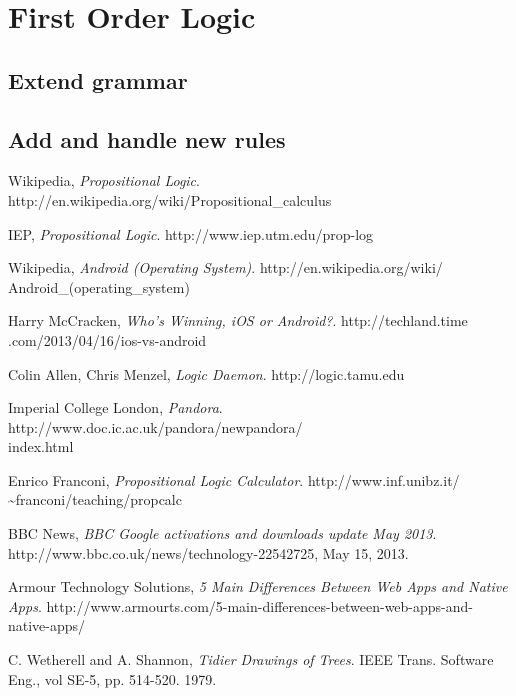 \documentclass{report}
\begin{document}
\section{First Order Logic}
\subsection{Extend grammar}
\subsection{Add and handle new rules}

\begin{thebibliography}{9}

  Wikipedia,
  \emph{Propositional Logic}.
  http://en.wikipedia.org/wiki/Propositional\_calculus

  IEP,
  \emph{Propositional Logic}.
  http://www.iep.utm.edu/prop-log

  Wikipedia,
  \emph{Android (Operating System)}.
  http://en.wikipedia.org/wiki/\\Android\_(operating\_system)

  Harry McCracken,
  \emph{Who’s Winning, iOS or Android?}.
  http://techland.time\\.com/2013/04/16/ios-vs-android

  Colin Allen, Chris Menzel,
  \emph{Logic Daemon}.
  http://logic.tamu.edu

  Imperial College London,
  \emph{Pandora}.
  http://www.doc.ic.ac.uk/pandora/newpandora/\\index.html

  Enrico Franconi,
  \emph{Propositional Logic Calculator}.
  http://www.inf.unibz.it/\\\textasciitilde franconi/teaching/propcalc

  BBC News,
  \emph{BBC Google activations and downloads update May 2013}. 
  http://www.bbc.co.uk/news/technology-22542725,
  May 15, 2013.

  Armour Technology Solutions,
  \emph{5 Main Differences Between Web Apps and Native Apps}.
  http://www.armourts.com/5-main-differences-between-web-apps-and-native-apps/

  C. Wetherell and A. Shannon,
  \emph{Tidier Drawings of Trees}.
  IEEE Trans. Software Eng., 
  vol SE-5, pp. 514-520.
  1979.


\end{thebibliography}
\end{document}

